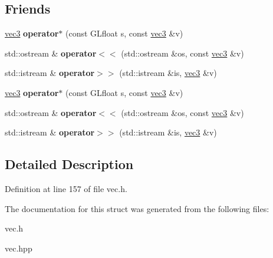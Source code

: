 \subsection*{\-Friends}
\begin{DoxyCompactItemize}
\item 
\hypertarget{struct_angel_1_1vec3_a1d78982e3d5969f2e9f98a536cfea9f7}{\hyperlink{struct_angel_1_1vec3}{vec3} {\bfseries operator$\ast$} (const \-G\-Lfloat s, const \hyperlink{struct_angel_1_1vec3}{vec3} \&v)}\label{struct_angel_1_1vec3_a1d78982e3d5969f2e9f98a536cfea9f7}

\item 
\hypertarget{struct_angel_1_1vec3_a3e8f4856b29a4320f185f9a9cf0f94bc}{std\-::ostream \& {\bfseries operator$<$$<$} (std\-::ostream \&os, const \hyperlink{struct_angel_1_1vec3}{vec3} \&v)}\label{struct_angel_1_1vec3_a3e8f4856b29a4320f185f9a9cf0f94bc}

\item 
\hypertarget{struct_angel_1_1vec3_ab705d3337286a4262e84bbbb0b694a56}{std\-::istream \& {\bfseries operator$>$$>$} (std\-::istream \&is, \hyperlink{struct_angel_1_1vec3}{vec3} \&v)}\label{struct_angel_1_1vec3_ab705d3337286a4262e84bbbb0b694a56}

\item 
\hypertarget{struct_angel_1_1vec3_a1d78982e3d5969f2e9f98a536cfea9f7}{\hyperlink{struct_angel_1_1vec3}{vec3} {\bfseries operator$\ast$} (const \-G\-Lfloat s, const \hyperlink{struct_angel_1_1vec3}{vec3} \&v)}\label{struct_angel_1_1vec3_a1d78982e3d5969f2e9f98a536cfea9f7}

\item 
\hypertarget{struct_angel_1_1vec3_a3e8f4856b29a4320f185f9a9cf0f94bc}{std\-::ostream \& {\bfseries operator$<$$<$} (std\-::ostream \&os, const \hyperlink{struct_angel_1_1vec3}{vec3} \&v)}\label{struct_angel_1_1vec3_a3e8f4856b29a4320f185f9a9cf0f94bc}

\item 
\hypertarget{struct_angel_1_1vec3_ab705d3337286a4262e84bbbb0b694a56}{std\-::istream \& {\bfseries operator$>$$>$} (std\-::istream \&is, \hyperlink{struct_angel_1_1vec3}{vec3} \&v)}\label{struct_angel_1_1vec3_ab705d3337286a4262e84bbbb0b694a56}

\end{DoxyCompactItemize}


\subsection{\-Detailed \-Description}


\-Definition at line 157 of file vec.\-h.



\-The documentation for this struct was generated from the following files\-:\begin{DoxyCompactItemize}
\item 
vec.\-h\item 
vec.\-hpp\end{DoxyCompactItemize}
